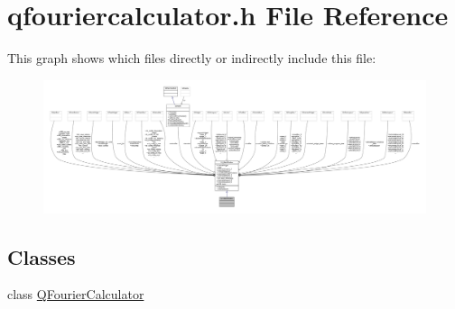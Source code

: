 \hypertarget{a00118}{\section{qfouriercalculator.\+h File Reference}
\label{a00118}
}
This graph shows which files directly or indirectly include this file\+:
\nopagebreak
\begin{figure}[H]
\begin{center}
\leavevmode
\includegraphics[width=350pt]{d8/dfc/a00327}
\end{center}
\end{figure}
\subsection*{Classes}
\begin{DoxyCompactItemize}
\item 
class \hyperlink{a00052}{Q\+Fourier\+Calculator}
\end{DoxyCompactItemize}
